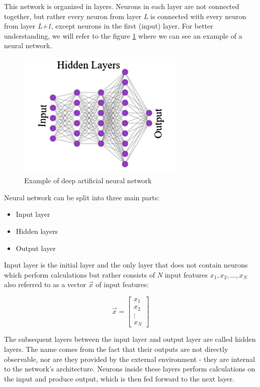 This network is organized in layers. Neurons in each layer are not connected together, but rather every neuron from layer \textit{L} is connected with every neuron from layer \textit{L+1}, except neurons in the first (input) layer. For better understanding, we will refer to the figure \ref{tab:artificial-nn} where we can see an example of a neural network.

\begin{figure}[H]
\begin{centering}
\includegraphics[width=8cm]{assets/images/neural_net.png}
\par\end{centering}
\caption{Example of deep artificial neural network \cite{TalaeiKhoei2023}}
\label{tab:artificial-nn}
\end{figure}

Neural network can be split into three main parts:

\begin{itemize}
    \item Input layer
    \item Hidden layers
    \item Output layer
\end{itemize}

Input layer is the initial layer and the only layer that does not contain neurons which perform calculations but rather consists of \textit{N} input features $x_1, x_2, \dots, x_N$ also referred to as a vector $\vec{x}$ of input features:

\[
\vec{x} = \begin{bmatrix}
x_1 \\
x_2 \\
\vdots \\
x_N
\end{bmatrix}
\]

The subsequent layers between the input layer and output layer are called hidden layers. The name comes from the fact that their outputs are not directly observable, nor are they provided by the external environment - they are internal to the network's architecture. Neurons inside these layers perform calculations on the input and produce output, which is then fed forward to the next layer.

